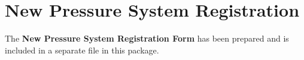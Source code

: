 \section{New Pressure System Registration}
\label{sec:registration}

The \textbf{New Pressure System Registration Form} has been prepared 
and is included in a separate file in this package.